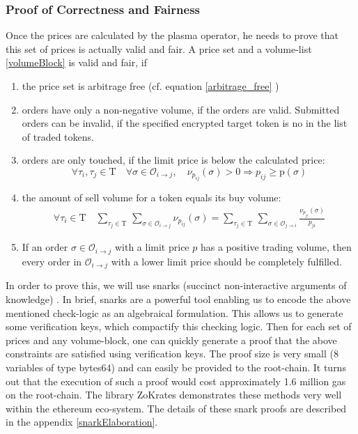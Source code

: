 \documentclass[11pt,parskip=full]{scrartcl}%
\newcommand{\Tau}{\mathrm{T}}
\def\pO{\mathcal{O}}
\def\ra{\rightarrow}
\begin{document}
\subsubsection*{Proof of Correctness and Fairness}
\label{proofprices}
Once the prices are calculated by the plasma operator, he needs to prove that this set of prices is actually valid and fair. A price set and a volume-list \ref{volumeBlock} is valid and fair, if

\begin{enumerate}

\item the price set is arbitrage free (cf. equation \ref{arbitrage_free} )
\item orders have only a non-negative volume, if the orders are valid. Submitted orders can be invalid, if the specified encrypted target token is no in the list of traded tokens.
\item orders are only touched, if the limit price is below the calculated price:\newline
\begin{equation} \forall \tau_i ,\tau_j \in \Tau \quad \forall \sigma \in \pO_{i\ra j}, \quad \nu_{p_{ij}}(\sigma)>0 \Rightarrow p_{ij}\geq \text{p}(\sigma)
\label{limitprice_sat}
\end{equation}
\item the amount of sell volume for a token equals its buy volume: 
\begin{equation}
\begin{split}
\forall \tau_i \in \Tau \quad \sum_{\tau_j\in \Tau} \,
\sum_{ \sigma\in \pO_{i \rightarrow j}} \nu_{p_{ij}}(\sigma) = \sum_{\tau_j\in \Tau} \, \sum_{\sigma\in \pO_{j\rightarrow i}} \frac{\nu_{p_{ji}}(\sigma)}{p_{ji}}
\label{volume_balance}
\end{split}
\end{equation}
\item If an order $\sigma \in \pO_{i\rightarrow j}$ with a limit price $p$ has a positive trading volume, then every order in $\pO_{i\rightarrow j}$ with a lower limit price should be completely fulfilled. 
\end{enumerate}


In order to prove this, we will use snarks (succinct non-interactive arguments of knowledge) \cite{snarks}. 
In brief, snarks are a powerful tool enabling us to encode the above mentioned check-logic as an algebraical formulation. 
This allows us to generate some verification keys, which compactify this checking logic. 
Then for each set of prices and any volume-block, one can quickly generate a proof that the above constraints are satisfied using verification keys. 
The proof size is very small (8 variables of type bytes64) and can easily be provided to the root-chain. 
It turns out that the execution of such a proof would cost approximately 1.6 million gas on the root-chain. 
The library ZoKrates \cite{zokrates} demonstrates these methods very well within the ethereum eco-system. 
The details of these snark proofs are described in the appendix \ref{snarkElaboration}.
\end{document}
